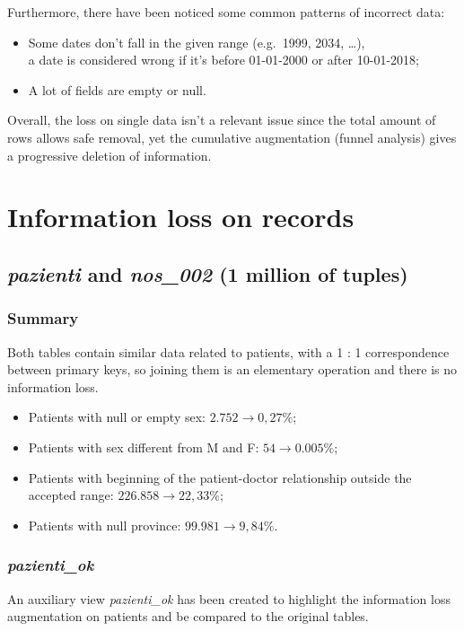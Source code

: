 Furthermore, there have been noticed some common patterns of incorrect data:
\begin{itemize}
	\item Some dates don't fall in the given range (e.g.\ 1999, 2034, \dots), \\
	a date is considered wrong if it's before 01-01-2000 or after 10-01-2018;
	\item A lot of fields are empty or null.
\end{itemize}

Overall, the loss on single data isn't a relevant issue since the total amount of rows allows safe removal, yet the cumulative augmentation (funnel analysis) gives a progressive deletion of information.

\section{Information loss on records}

\subsection{\textit{pazienti} and \textit{nos\_002} (1 million of tuples)}
\subsubsection{Summary}
Both tables contain similar data related to patients, with a 1 : 1 correspondence between primary keys, so joining them is an elementary operation and there is no information loss.

\begin{itemize}
	\item Patients with null or empty sex: $2.752 \rightarrow 0,27\%$;
	\item Patients with sex different from M and F: $54 \rightarrow 0.005\%$;
	\item Patients with beginning of the patient-doctor relationship outside the accepted range: $226.858 \rightarrow 22,33\%$;
	\item Patients with null province: $99.981 \rightarrow 9,84\%$.
\end{itemize}

\subsubsection{\textit{pazienti\_ok}}
An auxiliary view \textit{pazienti\_ok} has been created to highlight the information loss augmentation on patients and be compared to the original tables. 

